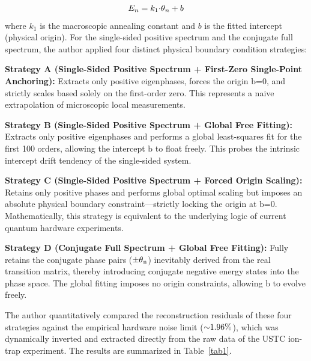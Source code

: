 \documentclass[mca,article,submit,oneauthor,pdftex]{Definitions/mdpi}
\begin{document}
\begin{equation}
{E}_{{n}} = {k}_{\text{1}}\text{\ensuremath{\cdot}}\text{\ensuremath{\theta}}_{{n}} + {b}
\end{equation}
where \({k}_{\text{1}}\) is the macroscopic annealing constant and
\({b}\) is the fitted intercept (physical origin). For the
single-sided positive spectrum and the conjugate full spectrum, the author
applied four distinct physical boundary condition strategies:

\textbf{Strategy A (Single-Sided Positive Spectrum + First-Zero
Single-Point Anchoring):} Extracts only positive eigenphases, forces the
origin \(\text{b}\text{=0}\), and strictly scales based solely on the
first-order zero. This represents a naive extrapolation of microscopic
local measurements.

\textbf{Strategy B (Single-Sided Positive Spectrum + Global Free
Fitting):} Extracts only positive eigenphases and performs a global
least-squares fit for the first 100 orders, allowing the intercept
\(\text{b}\) to float freely. This probes the intrinsic intercept
drift tendency of the single-sided system.

\textbf{Strategy C (Single-Sided Positive Spectrum + Forced Origin
Scaling):} Retains only positive phases and performs global optimal
scaling but imposes an absolute physical boundary constraint---strictly
locking the origin at \(\text{b}\text{=0}\). Mathematically, this
strategy is equivalent to the underlying logic of current quantum
hardware experiments.

\textbf{Strategy D (Conjugate Full Spectrum + Global Free Fitting):}
Fully retains the conjugate phase pairs
(\(\text{\ensuremath{\pm}}\text{\ensuremath{\theta}}_{\text{n}}\)) inevitably derived from the real
transition matrix, thereby introducing conjugate negative energy states
into the phase space. The global fitting imposes no origin constraints,
allowing \(\text{b}\) to evolve freely.

The author quantitatively compared the reconstruction residuals of these four
strategies against the empirical hardware noise limit
(\(\text{\ensuremath{\sim}1.96\%}\)), which was dynamically inverted and extracted
directly from the raw data of the USTC ion-trap experiment. The results
are summarized in Table~\ref{tab1}.
\end{document}

